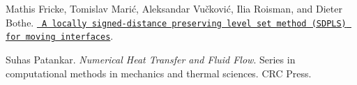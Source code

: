 
\begin{DoxyDescription}
\item[\label{citelist_CITEREF_fricke_locally_2022}%
\Hypertarget{citelist_CITEREF_fricke_locally_2022}%
\mbox{[}1\mbox{]}]Mathis Fricke, Tomislav Marić, Aleksandar Vučković, Ilia Roisman, and Dieter Bothe. \href{http://arxiv.org/abs/2208.01269}{\texttt{ A locally signed-\/distance preserving level set method (SDPLS) for moving interfaces}}. 


\item[\label{citelist_CITEREF_patankar_numerical_1980}%
\Hypertarget{citelist_CITEREF_patankar_numerical_1980}%
\mbox{[}2\mbox{]}]Suhas Patankar. {\itshape Numerical Heat Transfer and Fluid Flow}. Series in computational methods in mechanics and thermal sciences. CRC Press.


\end{DoxyDescription}
